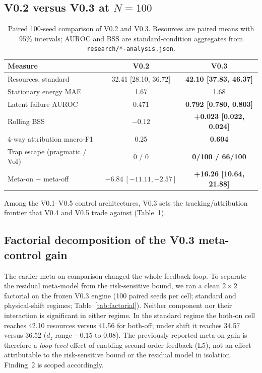 \documentclass{article}
\begin{document}
\subsection{V0.2 versus V0.3 at $N=100$}

\begin{table}[t]
\centering
\small
\caption{Paired 100-seed comparison of V0.2 and V0.3. Resources are paired means with 95\% intervals; AUROC and BSS are standard-condition aggregates from \texttt{research/*-analysis.json}.}
\label{tab:v02v03}
\begin{tabular}{lcc}
\toprule
Measure & V0.2 & V0.3 \\
\midrule
Resources, standard & 32.41 [28.10, 36.72] & \textbf{42.10 [37.83, 46.37]} \\
Stationary energy MAE & 1.67 & 1.68 \\
Latent failure AUROC & 0.471 & \textbf{0.792 [0.780, 0.803]} \\
Rolling BSS & $-0.12$ & \textbf{+0.023 [0.022, 0.024]} \\
4-way attribution macro-F1 & 0.25 & \textbf{0.604} \\
Trap escape (pragmatic / VoI) & 0 / 0 & \textbf{0/100 / 66/100} \\
Meta-on $-$ meta-off & $-6.84\ [-11.11,-2.57]$ & \textbf{+16.26 [10.64, 21.88]} \\
\bottomrule
\end{tabular}
\end{table}

Among the V0.1--V0.5 control architectures, V0.3 sets the tracking/attribution frontier that V0.4 and V0.5 trade against (Table~\ref{tab:v02v03}).

\subsection{Factorial decomposition of the V0.3 meta-control gain}

The earlier meta-on comparison changed the whole feedback loop. To separate the residual meta-model from the risk-sensitive bound, we ran a clean $2\times2$ factorial on the frozen V0.3 engine (100 paired seeds per cell; standard and physical-shift regimes; Table~\ref{tab:factorial}). Neither component nor their interaction is significant in either regime. In the standard regime the both-on cell reaches 42.10 resources versus 41.56 for both-off; under shift it reaches 34.57 versus 36.52 ($d_z$ range $-0.15$ to $0.08$). The previously reported meta-on gain is therefore a \emph{loop-level} effect of enabling second-order feedback (L5), not an effect attributable to the risk-sensitive bound or the residual model in isolation. Finding~2 is scoped accordingly.
\end{document}
